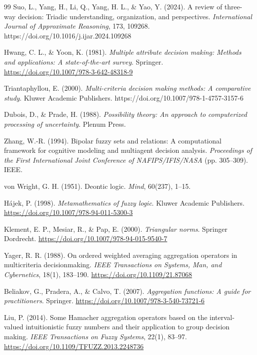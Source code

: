 \documentclass[reqno,final]{amsart}
\theoremstyle{definition}
\theoremstyle{plain}
\theoremstyle{remark}
\begin{document}
\begin{thebibliography}{99}
Suo, L., Yang, H., Li, Q., Yang, H. L., \& Yao, Y. (2024). A review of three-way decision: Triadic understanding, organization, and perspectives. \textit{International Journal of Approximate Reasoning}, 173, 109268. https://doi.org/10.1016/j.ijar.2024.109268

Hwang, C. L., \& Yoon, K. (1981). \textit{Multiple attribute decision making: Methods and applications: A state-of-the-art survey}. Springer. \url{https://doi.org/10.1007/978-3-642-48318-9}

Triantaphyllou, E. (2000). \textit{Multi-criteria decision making methods: A comparative study}. Kluwer Academic Publishers. https://doi.org/10.1007/978-1-4757-3157-6

Dubois, D., \& Prade, H. (1988). \textit{Possibility theory: An approach to computerized processing of uncertainty}. Plenum Press.

Zhang, W.-R. (1994). Bipolar fuzzy sets and relations: A computational framework for cognitive modeling and multiagent decision analysis. \textit{Proceedings of the First International Joint Conference of NAFIPS/IFIS/NASA} (pp. 305--309). IEEE.

von Wright, G. H. (1951). Deontic logic. \textit{Mind}, 60(237), 1--15.

H\'ajek, P. (1998). \textit{Metamathematics of fuzzy logic}. Kluwer Academic Publishers. \url{https://doi.org/10.1007/978-94-011-5300-3}

Klement, E. P., Mesiar, R., \& Pap, E. (2000). \textit{Triangular norms}. Springer Dordrecht. \url{https://doi.org/10.1007/978-94-015-9540-7}

Yager, R. R. (1988). On ordered weighted averaging aggregation operators in multicriteria decisionmaking. \textit{IEEE Transactions on Systems, Man, and Cybernetics}, 18(1), 183--190. \url{https://doi.org/10.1109/21.87068}

Beliakov, G., Pradera, A., \& Calvo, T. (2007). \textit{Aggregation functions: A guide for practitioners}. Springer. \url{https://doi.org/10.1007/978-3-540-73721-6}

Liu, P. (2014). Some Hamacher aggregation operators based on the interval-valued intuitionistic fuzzy numbers and their application to group decision making. \textit{IEEE Transactions on Fuzzy Systems}, 22(1), 83--97. \url{https://doi.org/10.1109/TFUZZ.2013.2248736}


\end{thebibliography}
\end{document}
